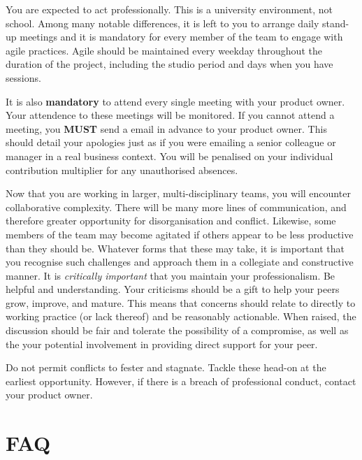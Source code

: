 \documentclass{../../fal_assignment}
\begin{document}

You are expected to act professionally. This is a university environment, not school. Among many notable differences, it is left to you to arrange daily stand-up meetings and it is mandatory for every member of the team to engage with agile practices. Agile should be maintained every weekday throughout the duration of the project, including the studio period and days when you have sessions. 

It is also \textbf{mandatory} to attend every single meeting with your product owner. Your attendence to these meetings will be monitored. If you cannot attend a meeting, you \textbf{MUST} send a email in advance to your product owner. This should detail your apologies just as if you were emailing a senior colleague or manager in a real business context. You will be penalised on your individual contribution multiplier for any unauthorised absences. 

Now that you are working in larger, multi-disciplinary teams, you will encounter collaborative complexity. There will be many more lines of communication, and therefore greater opportunity for disorganisation and conflict. Likewise, some members of the team may become agitated if others appear to be less productive than they should be. Whatever forms that these may take, it is important that you recognise such challenges and approach them in a collegiate and constructive manner. It is \textit{critically important} that you maintain your professionalism. Be helpful and understanding. Your criticisms should be a gift to help your peers grow, improve, and mature. This means that concerns should relate to directly to working practice (or lack thereof) and be reasonably actionable. When raised, the discussion should be fair and tolerate the possibility of a compromise, as well as the your potential involvement in providing direct support for your peer.    

Do not permit conflicts to fester and stagnate. Tackle these head-on at the earliest opportunity. However, if there is a breach of professional conduct, contact your product owner. 

\section*{FAQ}
\end{document}
